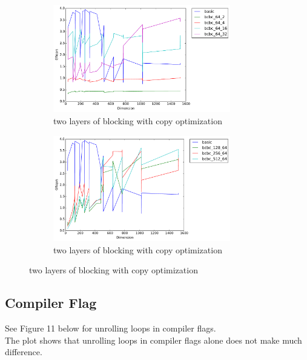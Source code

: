 \documentclass[12pt]{article}
\numberwithin{equation}{section}
\begin{document}
\begin{figure}[!ht]
   \begin{subfigure}
      \centering
        \begin{center}
      \includegraphics[width=0.85\textwidth] {timing_bcbc_1}
        \end{center}
      \label{aload0}
      \caption{two layers of blocking with copy optimization}
  \end{subfigure}
  \begin{subfigure}
      \centering
        \begin{center}
      \includegraphics[width=0.85\textwidth] {timing_bcbc_2}
        \end{center}
      \label{aload1}
      \caption{two layers of blocking with copy optimization}
  \end{subfigure}

\end{figure}

\subsection{Compiler Flag}

See Figure 11 below for unrolling loops in compiler flags.
\\
The plot shows that unrolling loops in compiler flags alone does not make much difference.
\end{document}
